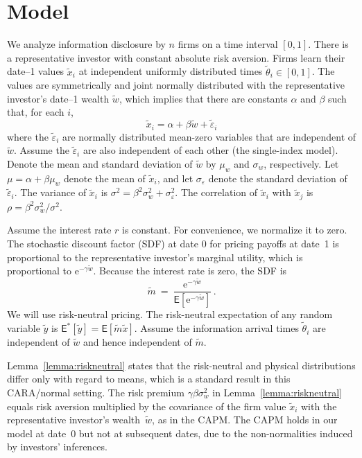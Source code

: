 \documentclass[authoryear,letterpaper,english,12pt]{elsarticle}
\theoremstyle{plain}
\numberwithin{lemma}{section}
\numberwithin{proposition}{section}
\numberwithin{equation}{section}
\numberwithin{figure}{section}
\newcommand{\E}{\mathrm{e}}
\newcommand{\mye}{\ensuremath{\mathsf{E}}}
\begin{document}
\section{Model}\label{s:model}




We analyze information disclosure by $n$ firms on a time interval $[0,1]$.  There is a representative investor with constant absolute risk aversion.
Firms learn their date--1 values $\tilde x_i$ at independent uniformly distributed times $\tilde \theta_i \in [0,1]$.  The values are symmetrically and joint normally distributed with the representative investor's date--1 wealth $\tilde w$, which implies that there are constants $\alpha$ and $\beta$ such that, for each $i$,
\begin{equation}
  \tilde x_i =  \alpha + \beta  \tilde w + \tilde \varepsilon_i
\end{equation} 
where the $\tilde \varepsilon_i$ are normally distributed mean-zero variables that are independent of $ \tilde w$.  Assume the $\tilde \varepsilon_i$ are also independent of each other (the single-index model).   Denote the mean and standard deviation of $\tilde w$ by $\mu_w$ and $\sigma_w$, respectively.
Let $\mu= \alpha + \beta \mu_w$ denote the mean of $\tilde x_i$, and let  $\sigma_\varepsilon$ denote the standard deviation of $\tilde \varepsilon_i$.  The variance of $\tilde x_i$ is $\sigma^2 =  \beta^2\sigma_w^2 + \sigma_\varepsilon^2$.  
The correlation of $\tilde x_i$ with $\tilde x_j$ is $\rho = \beta^2\sigma_w^2/\sigma^2$.

Assume the interest rate $r$ is constant.  For convenience, we normalize it to zero.
The stochastic discount factor (SDF) at date 0 for pricing payoffs at date~1 is proportional to the representative investor's marginal utility, which is proportional to  $\E^{-\gamma \tilde w}$.  Because the interest rate is zero, the SDF is 
\begin{equation}
 \tilde m \ = \ \frac{\E^{-\gamma \tilde w}}{\mye[\E^{-\gamma \tilde w}]}\,.
\end{equation}
  We will use risk-neutral pricing.  The risk-neutral expectation of any random variable $\tilde y$ is $\mye^*[\tilde y] = \mye[\tilde m\tilde x]$.
  Assume the information arrival times $\tilde \theta_i$ are independent of $\tilde w$ and hence independent of $\tilde m$.
  
  Lemma~\ref{lemma:riskneutral} states that  the risk-neutral and physical distributions differ only with regard to means, which is a standard result in this CARA/normal setting. The risk premium $\gamma\beta\sigma_w^2$ in Lemma~\ref{lemma:riskneutral} equals risk aversion multiplied by the covariance of the firm value $\tilde x_i$ with the representative investor's wealth~$\tilde w$, as in the CAPM.  The CAPM holds in our model at date~0 but not at subsequent dates, due to the non-normalities induced by investors' inferences.
\end{document}
